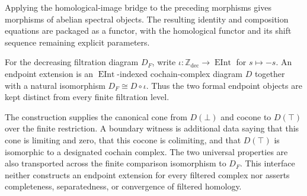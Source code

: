 \begin{definition}
  \label{def:filtered-complex-abelian-spectral-object-morphism}
  \leanok
  Applying the homological-image bridge to the preceding morphisms gives
  morphisms of abelian spectral objects.  The resulting identity and
  composition equations are packaged as a functor, with the homological
  functor and its shift sequence remaining explicit parameters.
\end{definition}

\begin{definition}
  \label{def:filtered-complex-endpoint-extension}
  \leanok
  For the decreasing filtration diagram $D_F$, write
  $\iota:\mathbb Z_{\mathrm{dec}}\to\operatorname{EInt}$ for
  $s\mapsto-s$.  An endpoint extension is an
  $\operatorname{EInt}$-indexed cochain-complex diagram $D$ together with a
  natural isomorphism $D_F\cong D\circ\iota$.  Thus the two formal endpoint
  objects are kept distinct from every finite filtration level.

  The construction supplies the canonical cone from $D(\bot)$ and cocone to
  $D(\top)$ over the finite restriction.  A boundary witness is additional
  data saying that this cone is limiting and zero, that this cocone is
  colimiting, and that $D(\top)$ is isomorphic to a designated cochain
  complex.  The two universal properties are also transported across the
  finite comparison isomorphism to $D_F$.  This interface neither constructs
  an endpoint extension for every filtered complex nor asserts completeness,
  separatedness, or convergence of filtered homology.
\end{definition}

